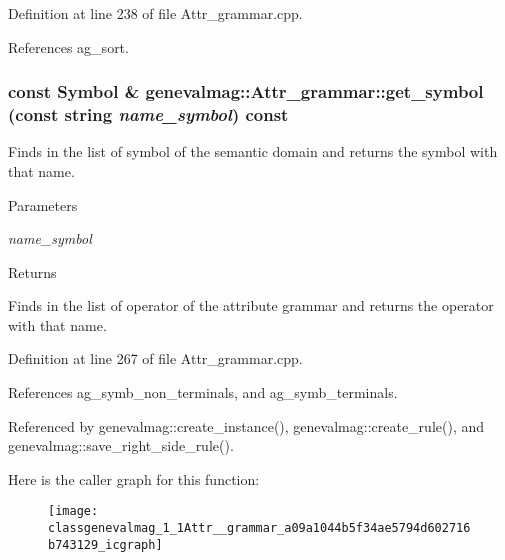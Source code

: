 Definition at line 238 of file Attr\_\-grammar.cpp.



References ag\_\-sort.

\hypertarget{classgenevalmag_1_1Attr__grammar_a09a1044b5f34ae5794d602716b743129}{
\subsubsection[{get\_\-symbol}]{\setlength{\rightskip}{0pt plus 5cm}const {\bf Symbol} \& genevalmag::Attr\_\-grammar::get\_\-symbol (const string {\em name\_\-symbol}) const}}
\label{classgenevalmag_1_1Attr__grammar_a09a1044b5f34ae5794d602716b743129}
Finds in the list of symbol of the semantic domain and returns the symbol with that name. 
\begin{DoxyParams}{Parameters}
\item[{\em name\_\-symbol}]\end{DoxyParams}
\begin{DoxyReturn}{Returns}

\end{DoxyReturn}
Finds in the list of operator of the attribute grammar and returns the operator with that name. 

Definition at line 267 of file Attr\_\-grammar.cpp.



References ag\_\-symb\_\-non\_\-terminals, and ag\_\-symb\_\-terminals.



Referenced by genevalmag::create\_\-instance(), genevalmag::create\_\-rule(), and genevalmag::save\_\-right\_\-side\_\-rule().



Here is the caller graph for this function:\nopagebreak
\begin{figure}[H]
\begin{center}
\leavevmode
\texttt{[image: classgenevalmag\_1\_1Attr\_\_grammar\_a09a1044b5f34ae5794d602716b743129\_icgraph]}
\end{center}
\end{figure}


